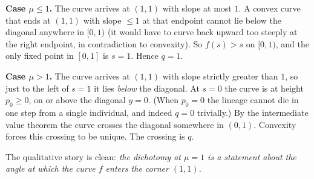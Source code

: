 \documentclass[11pt]{article}
\begin{document}
\medskip
\begin{center}
\end{center}

\textbf{Case $\mu \leq 1$.} The curve arrives at $(1,1)$ with slope at most $1$. A convex curve that ends at $(1, 1)$ with slope $\leq 1$ at that endpoint cannot lie below the diagonal anywhere in $[0,1)$ (it would have to curve back upward too steeply at the right endpoint, in contradiction to convexity). So $f(s) > s$ on $[0, 1)$, and the only fixed point in $[0, 1]$ is $s = 1$. Hence $q = 1$.

\smallskip
\textbf{Case $\mu > 1$.} The curve arrives at $(1, 1)$ with slope strictly greater than $1$, so just to the left of $s = 1$ it lies \emph{below} the diagonal. At $s = 0$ the curve is at height $p_0 \geq 0$, on or above the diagonal $y = 0$. (When $p_0 = 0$ the lineage cannot die in one step from a single individual, and indeed $q = 0$ trivially.) By the intermediate value theorem the curve crosses the diagonal somewhere in $(0, 1)$. Convexity forces this crossing to be unique. The crossing is $q$.

The qualitative story is clean: \emph{the dichotomy at $\mu = 1$ is a statement about the angle at which the curve $f$ enters the corner $(1, 1)$.}
\end{document}
